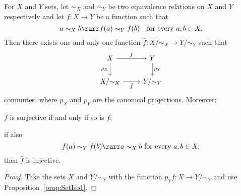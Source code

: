 \begin{corollary}\label{cor:SetIso2}
For \(X\) and \(Y\) sets, let \(\sim_X\) and \(\sim_Y\) be two equivalence relations on \(X\) and \(Y\) respectively and let \(f : X \to Y\) be a function such that
\[a \sim_X b \rarr f(a) \sim_Y f(b) \quad\text{for every } a, b \in X .\]
Then there exists one and only one function \(\bar f : X{/}{\sim_X} \to Y{/}{\sim_Y}\) such that
\[\begin{tikzcd}
X \ar["{p_X}", d, swap] \ar["f", r] & Y \ar["{p_Y}", d] \\
X{/}{\sim_X} \ar["{\bar f}", r, swap]   & Y{/}{\sim_Y}
\end{tikzcd}\]
commutes, where \(p_X\) and \(p_Y\) are the canonical projections. Moreover:
\begin{tcbenum}
\item \(\bar f\) is surjective if and only if so is \(f\);
\item if also
\[f(a) \sim_Y f(b) \rarr a \sim_X b \text{ for every } a, b \in X ,\]
then \(\bar f\) is injective.
\end{tcbenum}
\end{corollary}

\begin{proof}
Take the sets \(X\) and \(Y{/}{\sim_Y}\) with the function \(p_Y f : X \to Y{/}{\sim_Y}\) and use Proposition~\ref{prop:SetIso1}.
\end{proof}

